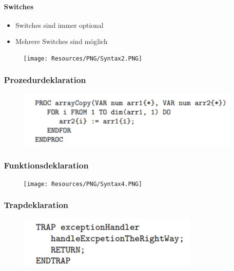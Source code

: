 \paragraph{Switches}
\begin{itemize}
	\item Switches sind immer optional
	\item Mehrere Switches sind möglich
\end{itemize}
\begin{figure}[H]
	\begin{center}
		\texttt{[image: Resources/PNG/Syntax2.PNG]}
		\caption{}
		\label{fig:PNG/Syntax2.PNG}
	\end{center}
\end{figure}
\subsubsection{Prozedurdeklaration}
\begin{figure}[H]
	\begin{center}
		\includegraphics[scale=0.9]{Resources/PNG/Syntax3.PNG}
		\caption{}
		\label{fig:PNG/Syntax3.PNG}
	\end{center}
\end{figure}
\subsubsection{Funktionsdeklaration}
\begin{figure}[H]
	\begin{center}
		\texttt{[image: Resources/PNG/Syntax4.PNG]}
		\caption{}
		\label{fig:PNG/Syntax4.PNG}
	\end{center}
\end{figure}
\subsubsection{Trapdeklaration}
\begin{figure}[H]
	\begin{center}
		\includegraphics[scale=0.9]{Resources/PNG/Syntax6.PNG}
		\caption{}
		\label{fig:PNG/Syntax6.PNG}
	\end{center}
\end{figure}
